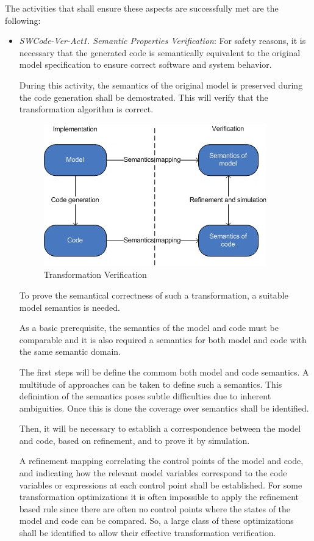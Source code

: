 The activities that shall ensure these aspects are successfully met
are the following:
\begin{itemize}
\item {\it SWCode-Ver-Act1. Semantic Properties Verification}: For
  safety reasons, it is necessary that the generated code is
  semantically equivalent to the original model specification to
  ensure correct software and system behavior.

  During this activity, the semantics of the original model is
  preserved during the code generation shall be demostrated. This will
  verify that the transformation algorithm is correct.

\begin{figure}[h]
  \centering
  \includegraphics[scale=1]{images/transformation_verification.jpg}
  \caption{Transformation Verification}
  \label{fig:transformationver}
\end{figure}

To prove the semantical correctness of such a transformation, a
suitable model semantics is needed.

As a basic prerequisite, the semantics of the model and code must be
comparable and it is also required a semantics for both model and code
with the same semantic domain.

The first steps will be define the commom both model and code
semantics. A multitude of approaches can be taken to define such a
semantics. This definintion of the semantics poses subtle difficulties
due to inherent ambiguities. Once this is done the coverage over
semantics shall be identified.

Then, it will be necessary to establish a correspondence between the
model and code, based on refinement, and to prove it by simulation.

A refinement mapping correlating the control points of the model and
code, and indicating how the relevant model variables correspond to
the code variables or expressions at each control point shall be
established. For some transformation optimizations it is often
impossible to apply the refinement based rule since there are often no
control points where the states of the model and code can be
compared. So, a large class of these optimizations shall be identified
to allow their effective transformation verification.


\end{itemize}
